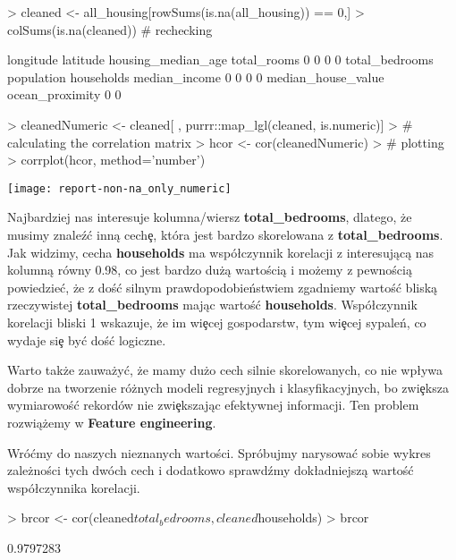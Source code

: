 \documentclass{article}
\begin{document}
\begin{Schunk}
\begin{Sinput}
> cleaned <- all_housing[rowSums(is.na(all_housing)) == 0,]
> colSums(is.na(cleaned))  # rechecking
\end{Sinput}
\begin{Soutput}
         longitude           latitude housing_median_age        total_rooms 
                 0                  0                  0                  0 
    total_bedrooms         population         households      median_income 
                 0                  0                  0                  0 
median_house_value    ocean_proximity 
                 0                  0 
\end{Soutput}
\begin{Sinput}
> cleanedNumeric <- cleaned[ , purrr::map_lgl(cleaned, is.numeric)]
> # calculating the correlation matrix
> hcor <- cor(cleanedNumeric)
> # plotting
> corrplot(hcor, method='number')
\end{Sinput}
\end{Schunk}
\texttt{[image: report-non-na\_only\_numeric]}

\noindent
\quad Najbardziej nas interesuje kolumna/wiersz \textbf{total\_bedrooms}, dlatego, że musimy znaleź\'c inną cech\c e, która jest bardzo skorelowana z \textbf{total\_bedrooms}. Jak widzimy, cecha \textbf{households} ma wspó\l czynnik korelacji z interesującą nas kolumną równy 0.98, co jest bardzo dużą wartością i możemy z pewnością powiedzie\'c, że z doś\'c silnym prawdopodobieństwiem zgadniemy wartoś\'c bliską rzeczywistej \textbf{total\_bedrooms} mając wartoś\'c \textbf{households}. Wspó\l czynnik korelacji bliski 1 wskazuje, że im wi\c ecej gospodarstw, tym wi\c ecej sypaleń, co wydaje si\c e by\'c doś\'c logiczne.

\noindent
\quad Warto także zauważy\'c, że mamy dużo cech silnie skorelowanych, co nie wp\l ywa dobrze na tworzenie różnych modeli regresyjnych i klasyfikacyjnych, bo zwi\c eksza wymiarowoś\'c rekordów nie zwi\c ekszając efektywnej informacji. Ten problem rozwiążemy w \textbf{Feature engineering}.

\noindent
\quad Wró\'cmy do naszych nieznanych wartości. Spróbujmy narysowa\'c sobie wykres zależności tych dwóch cech i dodatkowo sprawdźmy dok\l adniejszą wartoś\'c wspó\l czynnika korelacji.

\begin{Schunk}
\begin{Sinput}
> brcor <- cor(cleaned$total_bedrooms, cleaned$households)
> brcor
\end{Sinput}
\begin{Soutput}
[1] 0.9797283
\end{Soutput}
\end{Schunk}
\end{document}
